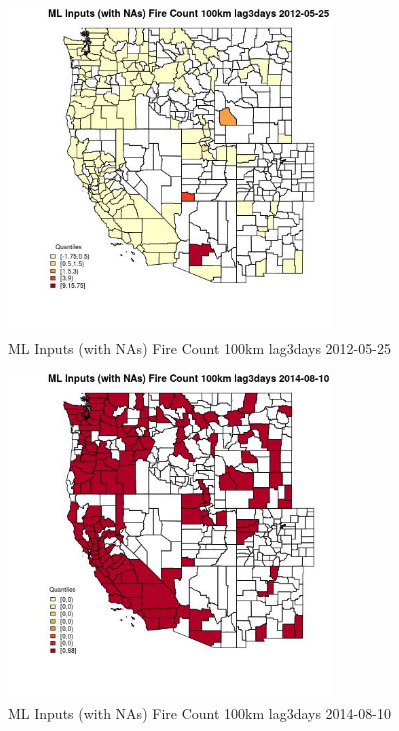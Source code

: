 \clearpage 

\begin{figure} 
\centering  
\includegraphics[width=0.77\textwidth]{Code_Outputs/Report_ML_input_PM25_Step4_part_e_de_duplicated_aves_compiled_2019-05-18wNAs_CountyFire_Count_100km_lag3daysMean2012-05-25_2012-05-25.jpg} 
\caption{\label{fig:Report_ML_input_PM25_Step4_part_e_de_duplicated_aves_compiled_2019-05-18wNAsCountyFire_Count_100km_lag3daysMean2012-05-25_2012-05-25}ML Inputs (with NAs) Fire Count 100km lag3days 2012-05-25} 
\end{figure} 
 

\begin{figure} 
\centering  
\includegraphics[width=0.77\textwidth]{Code_Outputs/Report_ML_input_PM25_Step4_part_e_de_duplicated_aves_compiled_2019-05-18wNAs_CountyFire_Count_100km_lag3daysMean2014-08-10_2014-08-10.jpg} 
\caption{\label{fig:Report_ML_input_PM25_Step4_part_e_de_duplicated_aves_compiled_2019-05-18wNAsCountyFire_Count_100km_lag3daysMean2014-08-10_2014-08-10}ML Inputs (with NAs) Fire Count 100km lag3days 2014-08-10} 
\end{figure} 
 

